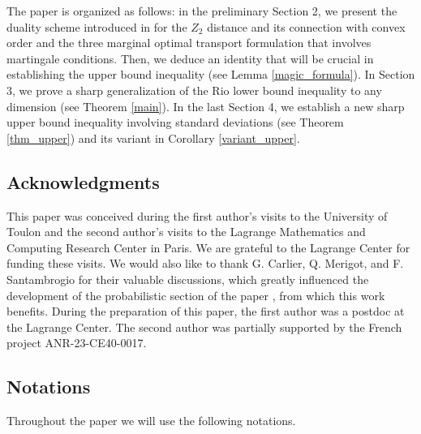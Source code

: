 \documentclass[11pt,reqno]{amsart}
\theoremstyle{definition}
\numberwithin{equation}{section}
\newcommand{\Mes}{{\mathcal{M}}}
\newcommand{\blue}{\textcolor{blue}}
\begin{document}
\medskip
The  paper is organized as follows: in the preliminary Section  2,  we present the duality scheme introduced in \cite{bolbou2024} for the $Z_2$ distance and its connection with convex order and the three marginal optimal transport formulation that involves martingale conditions. Then, we deduce an identity that will be crucial in establishing the upper bound inequality (see Lemma \ref{magic_formula}).
In Section 3, we prove a sharp  generalization of the Rio lower bound inequality to any dimension (see Theorem \ref{main}). In the last Section 4, we establish a new sharp upper bound inequality involving  standard deviations
(see Theorem \ref{thm_upper}) and its variant in Corollary \ref{variant_upper}.


\subsection*{Acknowledgments}

This paper was conceived during the first author's visits to the University of Toulon and the second author's visits to the Lagrange Mathematics and Computing Research Center in Paris.  We are grateful to the Lagrange Center for funding these visits. We would also like to thank G. Carlier, Q. Merigot, and F. Santambrogio for their valuable discussions, which greatly influenced the development of the probabilistic section of the paper \cite{bolbou2024}, from which this work benefits. During the preparation of this paper, the first author was a postdoc at the Lagrange Center.
The second author was partially supported by the French project ANR-23-CE40-0017.




\subsection*{Notations} Throughout the paper we will use the following notations.
\end{document}
